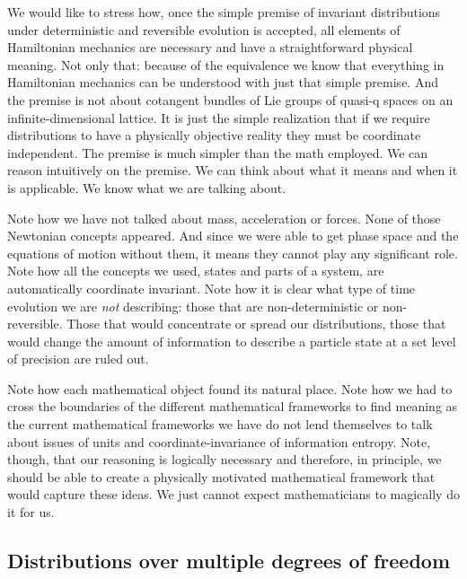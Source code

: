 \documentclass[11pt]{article}
\begin{document}
We would like to stress how, once the simple premise of invariant distributions under deterministic and reversible evolution is accepted, all elements of Hamiltonian mechanics are necessary and have a straightforward physical meaning. Not only that: because of the equivalence we know that everything in Hamiltonian mechanics can be understood with just that simple premise. And the premise is not about cotangent bundles of Lie groups of quasi-q spaces on an infinite-dimensional lattice. It is just the simple realization that if we require distributions to have a physically objective reality they must be coordinate independent. The premise is much simpler than the math employed. We can reason intuitively on the premise. We can think about what it means and when it is applicable. We know what we are talking about.

Note how we have not talked about mass, acceleration or forces. None of those Newtonian concepts appeared. And since we were able to get phase space and the equations of motion without them, it means they cannot play any significant role. Note how all the concepts we used, states and parts of a system, are automatically coordinate invariant. Note how it is clear what type of time evolution we are \emph{not} describing: those that are non-deterministic or non-reversible. Those that would concentrate or spread our distributions, those that would change the amount of information to describe a particle state at a set level of precision are ruled out.

Note how each mathematical object found its natural place. Note how we had to cross the boundaries of the different mathematical frameworks to find meaning as the current mathematical frameworks we have do not lend themselves to talk about issues of units and coordinate-invariance of information entropy. Note, though, that our reasoning is logically necessary and therefore, in principle, we should be able to create a physically motivated mathematical framework that would capture these ideas. We just cannot expect mathematicians to magically do it for us.

\subsection*{Distributions over multiple degrees of freedom}
\end{document}
